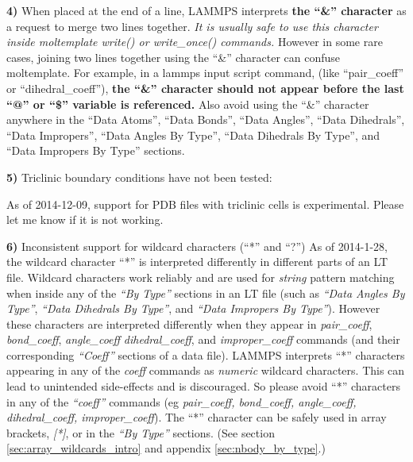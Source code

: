 \documentclass[11pt]{article}
\begin{document}
\textbf{4)} 
When placed at the end of a line, LAMMPS interprets 
\textbf{the ``\&'' character} as a 
request to merge two lines together.
\textit{It is usually safe to use this character inside
moltemplate write() or write\_once() commands.}
However in some rare cases, joining two lines together using 
the ``\&'' character can confuse moltemplate. 
For example, in a lammps input script command, 
(like ``pair\_coeff'' or ``dihedral\_coeff''), 
\textbf{the ``\&'' character should not appear before 
the last ``@'' or ``\$'' variable is referenced.}
Also avoid using the ``\&'' character anywhere in the 
``Data Atoms'', ``Data Bonds'', ``Data Angles'', ``Data Dihedrals'', ``Data Impropers'', ``Data Angles By Type'', ``Data Dihedrals By Type'', and ``Data Impropers By Type''
sections.

\textbf{5)} Triclinic boundary conditions have not been tested:

As of 2014-12-09, support for PDB files with triclinic cells is experimental.
Please let me know if it is not working.

\textbf{6)} Inconsistent support for wildcard characters (``*'' and ``?'') 
\label{sec:wildcard_bug}
   As of 2014-1-28,
   the wildcard character ``*''
   is interpreted differently in different parts of an LT file.
   Wildcard characters work reliably and are used for \textit{string}
   pattern matching when inside any of the \textit{``By Type''} sections 
   in an LT file (such as
   \textit{``Data Angles By Type''}, 
   \textit{``Data Dihedrals By Type''}, and 
   \textit{``Data Impropers By Type''}).
   However these characters are interpreted differently when they appear
   in \textit{pair\_coeff}, \textit{bond\_coeff}, \textit{angle\_coeff}
   \textit{dihedral\_coeff}, and \textit{improper\_coeff} commands 
   (and their corresponding \textit{``Coeff''} sections of a data file).
   LAMMPS interprets ``*'' characters appearing in any of the
   \textit{coeff} commands as \textit{numeric} wildcard characters.
   This can lead to unintended side-effects and is discouraged.
   So please avoid ``*'' characters in any of the 
   \textit{``coeff''} commands 
    (eg \textit{pair\_coeff, bond\_coeff, angle\_coeff, 
     dihedral\_coeff, improper\_coeff}).
   The ``*'' character can be safely used in array brackets, \textit{[*]}, 
   or in the \textit{``By Type''} sections.
   (See section \ref{sec:array_wildcards_intro} 
    and appendix \ref{sec:nbody_by_type}.)

\pagebreak
\end{document}
